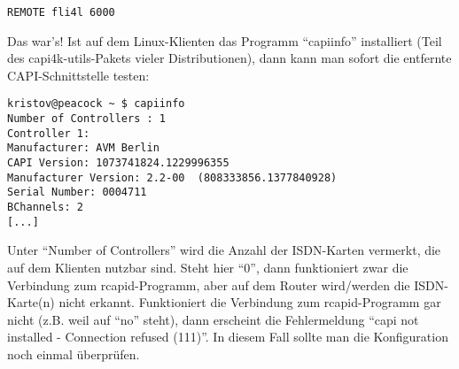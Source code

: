 \begin{example}
\begin{verbatim}
REMOTE fli4l 6000
\end{verbatim}
\end{example}

Das war's! Ist auf dem Linux-Klienten das Programm ``capiinfo'' installiert
(Teil des capi4k-utils-Pakets vieler Distributionen), dann kann man sofort die
entfernte CAPI-Schnittstelle testen:

\begin{example}
\begin{verbatim}
kristov@peacock ~ $ capiinfo 
Number of Controllers : 1
Controller 1:
Manufacturer: AVM Berlin
CAPI Version: 1073741824.1229996355
Manufacturer Version: 2.2-00  (808333856.1377840928)
Serial Number: 0004711
BChannels: 2
[...]
\end{verbatim}
\end{example}

Unter ``Number of Controllers'' wird die Anzahl der ISDN-Karten vermerkt, die
auf dem Klienten nutzbar sind. Steht hier ``0'', dann funktioniert zwar die
Verbindung zum rcapid-Programm, aber auf dem Router wird/werden die
ISDN-Karte(n) nicht erkannt. Funktioniert die Verbindung zum rcapid-Programm
gar nicht (z.B. weil  auf ``no'' steht), dann erscheint die
Fehlermeldung ``capi not installed - Connection refused (111)''. In diesem Fall
sollte man die Konfiguration noch einmal überprüfen.
